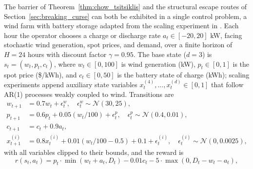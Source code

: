 The barrier of Theorem~\ref{thm:chow_tsitsiklis} and the structural escape routes of Section~\ref{sec:breaking_curse} can both be exhibited in a single control problem, a wind farm with battery storage adapted from the scaling experiment in \citet{lu2025}. Each hour the operator chooses a charge or discharge rate $a_t \in [-20, 20]$ kW, facing stochastic wind generation, spot prices, and demand, over a finite horizon of $H = 24$ hours with discount factor $\gamma = 0.95$. The base state ($d = 3$) is $s_t = (w_t, p_t, c_t)$, where $w_t \in [0, 100]$ is wind generation (kW), $p_t \in [0, 1]$ is the spot price (\$/kWh), and $c_t \in [0, 50]$ is the battery state of charge (kWh); scaling experiments append auxiliary state variables $x_t^{(4)}, \ldots, x_t^{(d)} \in [0, 1]$ that follow AR(1) processes weakly coupled to wind. Transitions are
\begin{align}
w_{t+1} &= 0.7 w_t + \epsilon_t^w, \quad \epsilon_t^w \sim \mathcal{N}(30, 25), \\
p_{t+1} &= 0.6 p_t + 0.05 (w_t / 100) + \epsilon_t^p, \quad \epsilon_t^p \sim \mathcal{N}(0.4, 0.01), \\
c_{t+1} &= c_t + 0.9 a_t, \\
x_{t+1}^{(i)} &= 0.8 x_t^{(i)} + 0.01(w_t/100 - 0.5) + 0.1 + \epsilon_t^{(i)}, \quad \epsilon_t^{(i)} \sim \mathcal{N}(0, 0.0025),
\end{align}
with all variables clipped to their bounds, and the reward is
\begin{equation}
r(s_t, a_t) = p_t \cdot \min(w_t + a_t, D_t) - 0.01 c_t - 5 \cdot \max(0, D_t - w_t - a_t),
\end{equation}
